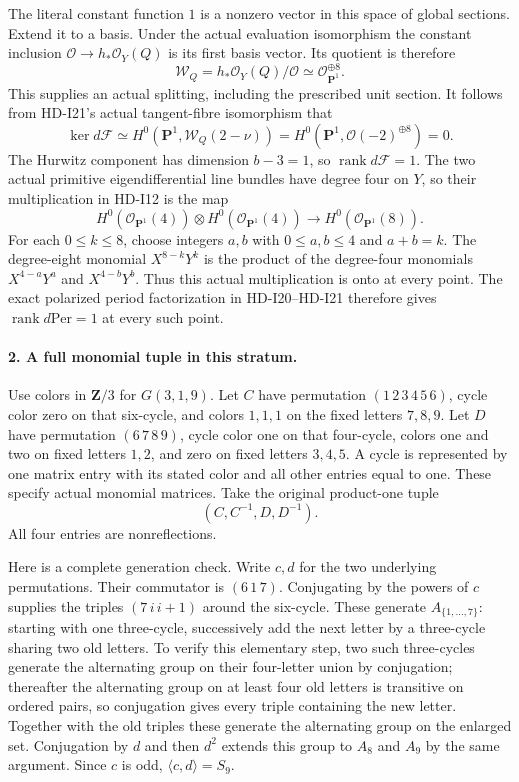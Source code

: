 The literal constant function $1$ is a nonzero vector in
this space of global sections. Extend it to a basis. Under
the actual evaluation isomorphism the constant inclusion
$\mathcal O\to h_*\mathcal O_Y(Q)$ is its first basis
vector. Its quotient is therefore
\[
 \mathcal W_Q=h_*\mathcal O_Y(Q)/\mathcal O
                   \simeq\mathcal O_{\mathbf P^1}^{\oplus8}.
\]
This supplies an actual splitting, including the prescribed
unit section. It follows from HD-I21's actual tangent-fibre
isomorphism that
\[
 \ker d\mathcal F
   \simeq H^0(\mathbf P^1,\mathcal W_Q(2-\nu))
   =H^0(\mathbf P^1,\mathcal O(-2)^{\oplus8})=0.
\]
The Hurwitz component has dimension $b-3=1$, so
$\operatorname{rank}d\mathcal F=1$. The two actual primitive
eigendifferential line bundles have degree four on $Y$,
so their multiplication in HD-I12 is the map
\[
 H^0(\mathcal O_{\mathbf P^1}(4))\otimes
 H^0(\mathcal O_{\mathbf P^1}(4))
       \longrightarrow H^0(\mathcal O_{\mathbf P^1}(8)).
\]
For each $0\le k\le8$, choose integers $a,b$ with
$0\le a,b\le4$ and $a+b=k$. The degree-eight monomial
$X^{8-k}Y^k$ is the product of the degree-four monomials
$X^{4-a}Y^a$ and $X^{4-b}Y^b$. Thus this actual
multiplication is onto at every point. The exact polarized period factorization
in HD-I20--HD-I21 therefore gives
$\operatorname{rank}d\mathrm{Per}=1$ at every such point.

\paragraph{2. A full monomial tuple in this stratum.}
Use colors in $\mathbf Z/3$ for $G(3,1,9)$.
Let $C$ have permutation $(1\,2\,3\,4\,5\,6)$,
cycle color zero on that six-cycle, and colors $1,1,1$
on the fixed letters $7,8,9$. Let $D$ have permutation
$(6\,7\,8\,9)$, cycle color one on that four-cycle,
colors one and two on fixed letters $1,2$, and zero on
fixed letters $3,4,5$. A cycle is represented by one
matrix entry with its stated color and all other entries
equal to one. These specify actual monomial matrices.
Take the original product-one tuple
\[
                    (C,C^{-1},D,D^{-1}).
\]
All four entries are nonreflections.

Here is a complete generation check. Write $c,d$ for the
two underlying permutations. Their commutator is
$(6\,1\,7)$. Conjugating by the powers of $c$ supplies
the triples $(7\,i\,i+1)$ around the six-cycle. These
generate $A_{\{1,\ldots,7\}}$: starting with one
three-cycle, successively add the next letter by a
three-cycle sharing two old letters. To verify this
elementary step, two such three-cycles generate the
alternating group on their four-letter union by
conjugation; thereafter the alternating group on at
least four old letters is transitive on ordered pairs,
so conjugation gives every triple containing the new
letter. Together with the old triples these generate
the alternating group on the enlarged set.
Conjugation by $d$ and then $d^2$ extends this group to
$A_8$ and $A_9$ by the same argument. Since $c$ is odd,
$\langle c,d\rangle=S_9$.

